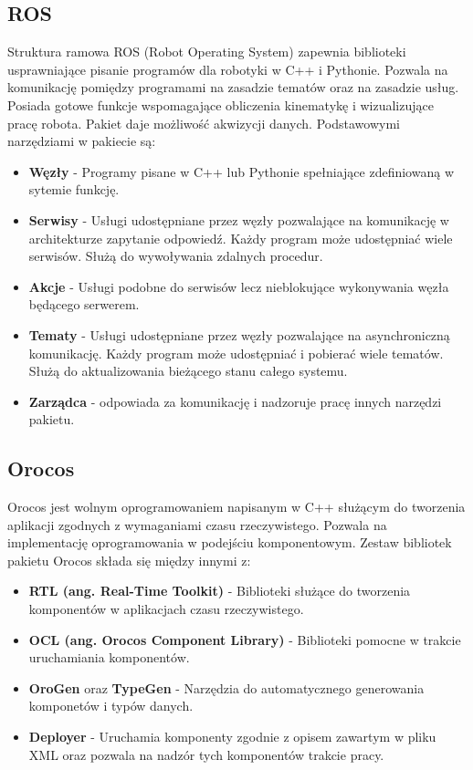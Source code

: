 	\subsection{ROS}
	Struktura ramowa ROS (Robot Operating System)\cite{bib:ROS} zapewnia biblioteki usprawniające pisanie programów dla robotyki w C++ i Pythonie. Pozwala na komunikację pomiędzy programami na zasadzie tematów oraz na zasadzie usług. Posiada gotowe funkcje wspomagające obliczenia kinematykę i wizualizujące pracę robota. Pakiet daje możliwość akwizycji danych. Podstawowymi narzędziami w pakiecie są:
	\begin{itemize}
		\item \textbf{Węzły} - Programy pisane w C++ lub Pythonie spełniające zdefiniowaną w sytemie funkcję.
		\item \textbf{Serwisy} - Usługi udostępniane przez węzły pozwalające na komunikację w architekturze zapytanie odpowiedź. Każdy program może udostępniać wiele serwisów. Służą do wywoływania zdalnych procedur.
		\item \textbf{Akcje} - Usługi podobne do serwisów lecz nieblokujące wykonywania węzła będącego serwerem.
		\item \textbf{Tematy} - Usługi udostępniane przez węzły pozwalające na asynchroniczną komunikację. Każdy program może udostępniać i pobierać wiele tematów. Służą do aktualizowania bieżącego stanu całego systemu.
		\item \textbf{Zarządca} - odpowiada za komunikację i nadzoruje pracę innych narzędzi pakietu.
	\end{itemize}
	\subsection{Orocos}
	Orocos \cite{bib:Orocos}jest wolnym oprogramowaniem napisanym w C++ służącym do tworzenia aplikacji zgodnych z wymaganiami czasu rzeczywistego. Pozwala na implementację  oprogramowania w podejściu komponentowym. Zestaw bibliotek pakietu Orocos składa się między innymi z:
	\begin{itemize}
		\item \textbf{RTL (ang. Real-Time Toolkit)} - Biblioteki służące do  tworzenia komponentów w aplikacjach czasu rzeczywistego.
		\item \textbf{OCL (ang. Orocos Component Library)} - Biblioteki pomocne w trakcie uruchamiania komponentów.
		\item \textbf{OroGen} oraz \textbf{TypeGen} - Narzędzia do automatycznego generowania komponetów i typów danych.
		\item \textbf{Deployer} - Uruchamia komponenty zgodnie z opisem zawartym w pliku XML oraz pozwala na nadzór tych komponentów trakcie pracy.
	\end{itemize}

